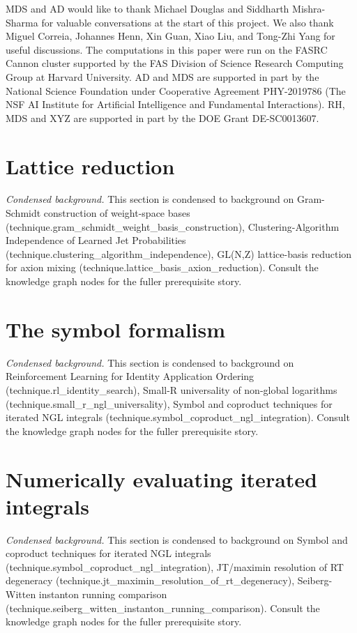 \documentclass[a4paper,11pt]{article}
\begin{document}
\acknowledgments

MDS and AD would like to thank Michael Douglas and Siddharth Mishra-Sharma for valuable conversations at the start of this project. We also thank Miguel Correia, Johannes Henn, Xin Guan, Xiao Liu, and Tong-Zhi Yang for useful discussions.
The computations in this paper were run on the FASRC Cannon cluster supported by the FAS Division of Science Research Computing Group at Harvard University. AD and MDS are supported in part by the National Science Foundation under Cooperative Agreement PHY-2019786 (The NSF AI Institute for Artificial Intelligence and Fundamental Interactions). RH, MDS and XYZ are supported in part by the DOE Grant DE-SC0013607.



\appendix

\section{Lattice reduction }

\noindent\textit{Condensed background.} This section is condensed to background on Gram-Schmidt construction of weight-space bases (technique.gram\_schmidt\_weight\_basis\_construction), Clustering-Algorithm Independence of Learned Jet Probabilities (technique.clustering\_algorithm\_independence), GL(N,Z) lattice-basis reduction for axion mixing (technique.lattice\_basis\_axion\_reduction). Consult the knowledge graph nodes for the fuller prerequisite story.

\section{The symbol formalism}

\noindent\textit{Condensed background.} This section is condensed to background on Reinforcement Learning for Identity Application Ordering (technique.rl\_identity\_search), Small-R universality of non-global logarithms (technique.small\_r\_ngl\_universality), Symbol and coproduct techniques for iterated NGL integrals (technique.symbol\_coproduct\_ngl\_integration). Consult the knowledge graph nodes for the fuller prerequisite story.

\section{Numerically evaluating iterated integrals}

\noindent\textit{Condensed background.} This section is condensed to background on Symbol and coproduct techniques for iterated NGL integrals (technique.symbol\_coproduct\_ngl\_integration), JT/maximin resolution of RT degeneracy (technique.jt\_maximin\_resolution\_of\_rt\_degeneracy), Seiberg-Witten instanton running comparison (technique.seiberg\_witten\_instanton\_running\_comparison). Consult the knowledge graph nodes for the fuller prerequisite story.
\end{document}
